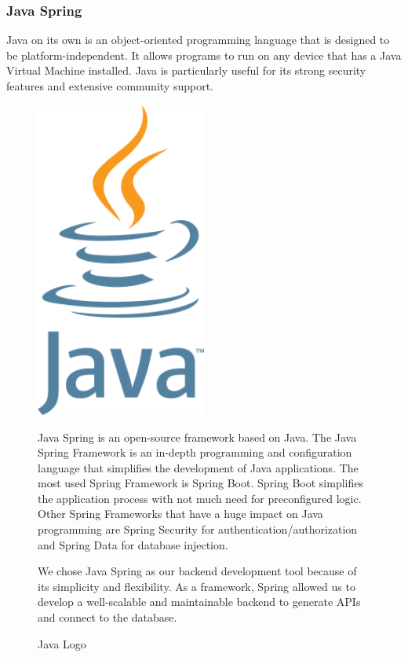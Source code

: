 \Author{\daAuthorThree}

\subsubsection{Java Spring}

Java on its own is an object-oriented programming language that is designed to be platform-independent. It allows programs to run on any device that has a Java Virtual Machine installed. Java is particularly useful for its strong security features and extensive community support.

\blankLine 

\begin{figure}[H]
    \centering
    \begin{minipage}{0.35\textwidth}
        \center
        \includegraphics [width=0.5\textwidth] {images/Technologies/javaLogo.png}
        \caption{Java Logo \autocite{Java:Logo}}
    \end{minipage}
    \hfill
    \begin{minipage}{0.6\textwidth}
      \setlength{\baselineskip}{1.5em}
      \vspace{-1em}
      Java Spring is an open-source framework based on Java. The Java Spring Framework is an in-depth programming and configuration language that simplifies the development of Java applications. The most used Spring Framework is Spring Boot. Spring Boot simplifies the application process with not much need for preconfigured logic. Other Spring Frameworks that have a huge impact on Java programming are Spring Security for authentication/authorization and Spring Data for database injection. 
      
      We chose Java Spring as our backend development tool because of its simplicity and flexibility. As a framework, Spring allowed us to develop a well-scalable and maintainable backend to generate APIs and connect to the database.       
    \end{minipage}
\end{figure}
